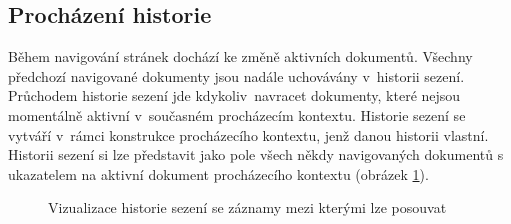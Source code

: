 \subsection{Procházení historie}
\label{Chapter.Implementation.TraversingHistory}

Během navigování stránek dochází ke změně aktivních dokumentů. Všechny předchozí navigované dokumenty jsou nadále uchovávány v~historii sezení. Průchodem historie sezení jde kdykoliv~navracet dokumenty, které nejsou momentálně aktivní v~současném procházecím kontextu. Historie sezení se vytváří v~rámci konstrukce procházecího kontextu, jenž danou historii vlastní. Historii sezení si lze představit jako pole všech někdy navigovaných dokumentů s ukazatelem na aktivní dokument procházecího kontextu (obrázek \ref{Figure.SessionHistory}).

\begin{figure}[H]
  \begin{center}
    \caption{Vizualizace historie sezení se záznamy mezi kterými lze posouvat}
    \label{Figure.SessionHistory}
  \end{center}
\end{figure}

